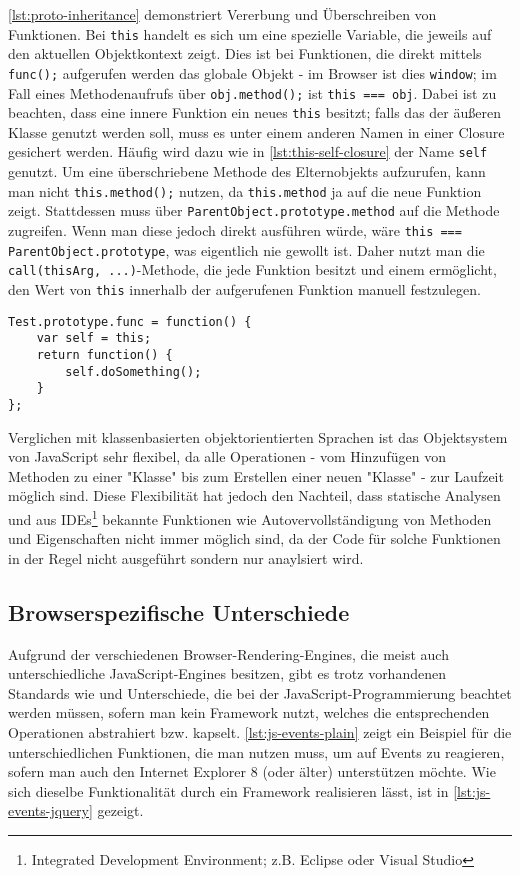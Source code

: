 \autoref{lst:proto-inheritance} demonstriert Vererbung und Überschreiben von Funktionen. Bei
\lstinline{this} handelt es sich um eine spezielle Variable, die jeweils auf den aktuellen
Objektkontext zeigt. Dies ist bei Funktionen, die direkt mittels \lstinline{func();} aufgerufen
werden das globale Objekt - im Browser ist dies \lstinline{window}; im Fall eines Methodenaufrufs
über \lstinline{obj.method();} ist \lstinline{this === obj}. Dabei ist zu beachten, dass eine innere
Funktion ein neues \lstinline{this} besitzt; falls das der äußeren Klasse genutzt werden soll, muss
es unter einem anderen Namen in einer Closure gesichert werden. Häufig wird dazu wie in
\autoref{lst:this-self-closure} der Name \lstinline{self} genutzt. Um eine überschriebene Methode
des Elternobjekts aufzurufen, kann man nicht \lstinline{this.method();} nutzen, da
\lstinline{this.method} ja auf die neue Funktion zeigt. Stattdessen muss über
\lstinline{ParentObject.prototype.method} auf die Methode zugreifen. Wenn man diese jedoch direkt
ausführen würde, wäre \lstinline{this === ParentObject.prototype}, was eigentlich nie gewollt ist.
Daher nutzt man die \lstinline{call(thisArg, ...)}-Methode, die jede Funktion besitzt und einem
ermöglicht, den Wert von \lstinline{this} innerhalb der aufgerufenen Funktion manuell festzulegen.

\begin{lstlisting}[label=lst:this-self-closure,caption=Sichern von this mittels einer Closure]
Test.prototype.func = function() {
    var self = this;
    return function() {
        self.doSomething();
    }
};
\end{lstlisting}

Verglichen mit klassenbasierten objektorientierten Sprachen ist das Objektsystem von JavaScript sehr
flexibel, da alle Operationen - vom Hinzufügen von Methoden zu einer "Klasse" bis zum Erstellen einer
neuen "Klasse" - zur Laufzeit möglich sind. Diese Flexibilität hat jedoch den Nachteil, dass
statische Analysen und aus IDEs\footnote{Integrated Development Environment; z.B. Eclipse oder
Visual Studio} bekannte Funktionen wie Autovervollständigung von Methoden und Eigenschaften nicht
immer möglich sind, da der Code für solche Funktionen in der Regel nicht ausgeführt sondern nur
anaylsiert wird.

\subsection{Browserspezifische Unterschiede}\label{js-events}
Aufgrund der verschiedenen Browser-Rendering-Engines, die meist auch unterschiedliche
JavaScript-Engines besitzen, gibt es trotz vorhandenen Standards wie \citep{ecmascript} und
\citep{w3c:dom} Unterschiede, die bei der JavaScript-Programmierung beachtet werden müssen, sofern
man kein Framework nutzt, welches die entsprechenden Operationen abstrahiert bzw. kapselt.
\autoref{lst:js-events-plain} zeigt ein Beispiel für die unterschiedlichen Funktionen, die man nutzen
muss, um auf Events zu reagieren, sofern man auch den Internet Explorer 8 (oder älter) unterstützen
möchte. Wie sich dieselbe Funktionalität durch ein Framework realisieren lässt, ist in
\autoref{lst:js-events-jquery} gezeigt.


